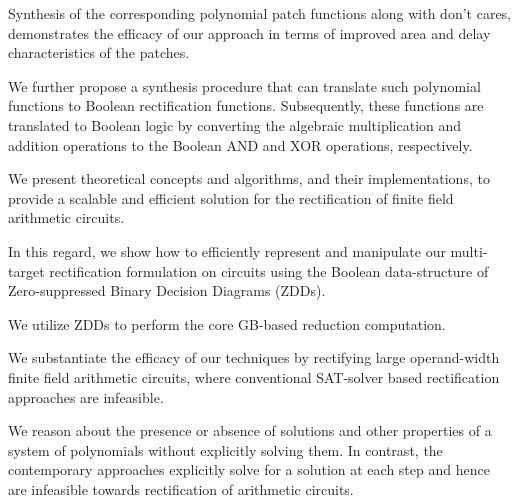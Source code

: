     \item Synthesis of the corresponding polynomial patch functions along with don't cares, demonstrates the efficacy of our approach in terms of improved area and delay characteristics of the patches.

\ei
\ei

\item  We further propose a synthesis
procedure that can translate such polynomial functions to Boolean rectification 
functions. Subsequently, these functions are translated to Boolean logic by converting the algebraic multiplication and addition operations to the Boolean AND and XOR operations, respectively.

\item We present theoretical concepts and algorithms, and their implementations, 
to provide a scalable and efficient solution for the rectification of finite field arithmetic circuits.
\bi
\item In this regard, we show how to efficiently represent and manipulate our multi-target rectification formulation on circuits using the Boolean data-structure of Zero-suppressed Binary Decision Diagrams (ZDDs).
\item We utilize ZDDs to perform the core GB-based reduction computation.
\ei

\item We substantiate the efficacy of our techniques by rectifying 
large operand-width finite field arithmetic circuits, where conventional SAT-solver based 
rectification approaches are infeasible.
\bi

\item We reason about the presence or absence of solutions and other properties of a system of polynomials without explicitly solving them. 
In contrast, the contemporary approaches explicitly solve for a solution at each step and hence are infeasible towards rectification of arithmetic circuits.
\ei

 
\ei






